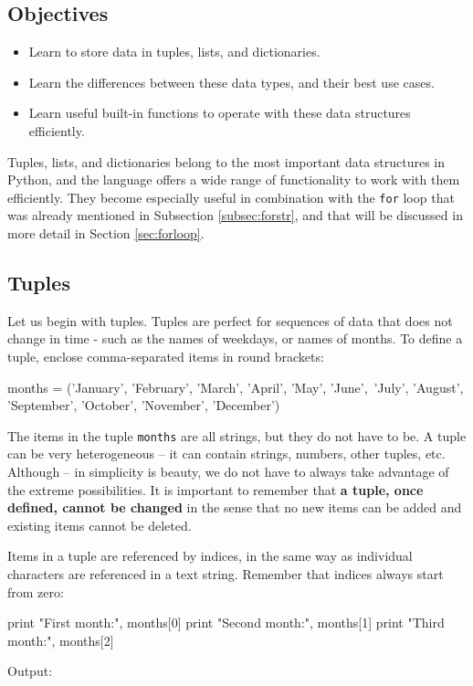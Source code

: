 \subsection{Objectives}

\begin{itemize}
\item Learn to store data in tuples, lists, and dictionaries.
\item Learn the differences between these data types, and their best use cases.
\item Learn useful built-in functions to operate with these data structures efficiently. 
\end{itemize}
Tuples, lists, and dictionaries belong to the most important data structures in Python, and the 
language offers a wide range of functionality to work with them efficiently. They become 
especially useful in combination with the {\tt for}
loop that was already mentioned in Subsection \ref{subsec:forstr}, and that will be 
discussed in more detail in Section \ref{sec:forloop}. 

\subsection{Tuples}

Let us begin with tuples. Tuples are perfect for sequences 
of data that does not change in time - such as 
the names of weekdays, or names of months. To define a tuple, 
enclose comma-separated items in round brackets:

\begin{bluecode}
months = ('January', 'February', 'March', 'April', 'May', 'June',\
'July', 'August', 'September', 'October', 'November', 'December')
\end{bluecode}
The items in the tuple {\tt months} are all strings, but they do not
have to be. A tuple can be very heterogeneous -- it can contain strings,
numbers, other tuples, etc. Although -- in simplicity is beauty, we
do not have to always take advantage of the extreme possibilities.
It is important to remember that {\bf a tuple, once defined, cannot 
be changed} in the sense that no new items can be added and existing 
items cannot be deleted.

Items in a tuple are referenced by indices, in the same way as individual 
characters are referenced in a text string. Remember that indices always 
start from zero:

\begin{bluecode}
print "First month:", months[0]
print "Second month:", months[1]
print "Third month:", months[2]
\end{bluecode}
Output:

